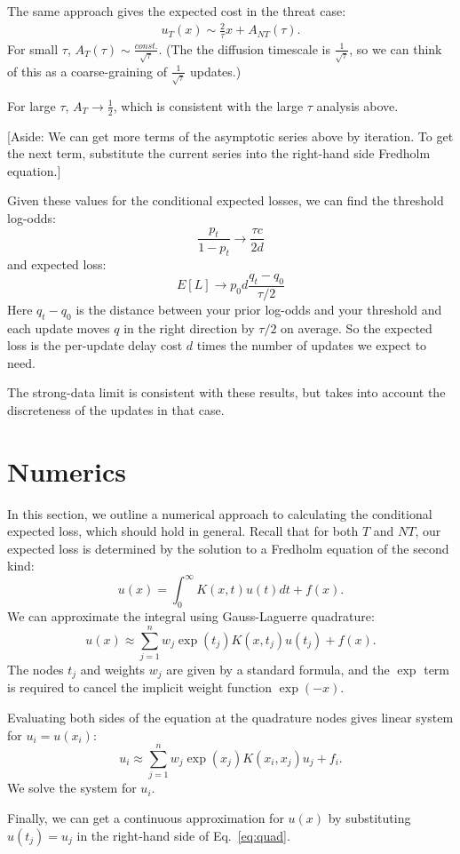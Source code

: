 \documentclass[12pt, letterpaper]{article}
\begin{document}
The same approach gives the expected cost in the threat case:
\begin{align}
    u_{T}(x) \sim \frac{2}{\tau} x + A_{NT}(\tau).
\end{align}
For small $\tau$, $A_{T}(\tau) \sim \frac{const.}{\sqrt{\tau}}$.
(The the diffusion timescale is $\frac{1}{\sqrt{\tau}}$, so we can think of this as a coarse-graining of $\frac{1}{\sqrt{\tau}}$ updates.)

For large $\tau$, $A_{T} \to \frac{1}{2}$, which is consistent with the large $\tau$ analysis above.

[Aside: We can get more terms of the asymptotic series above by iteration. To get the next term, substitute the current series into the right-hand side Fredholm equation.]

Given these values for the conditional expected losses, we can find the threshold log-odds:
\begin{equation}\frac{p_t}{1 - p_t} \to \frac{\tau c}{2 d}\end{equation}
and expected loss:
\begin{equation}E[L] \to p_0 d \frac{q_t - q_0}{\tau / 2}\end{equation}
Here $q_t - q_0$ is the distance between your prior log-odds and your threshold and each update moves $q$ in the right direction by $\tau / 2$ on average.
So the expected loss is the per-update delay cost $d$ times the number of updates we expect to need.

The strong-data limit is consistent with these results, but takes into account the discreteness of the updates in that case.

\section{Numerics}

In this section, we outline a numerical approach to calculating the conditional expected loss, which should hold in general.
Recall that for both $T$ and $NT$, our expected loss is determined by the solution to a Fredholm equation of the second kind:
\begin{equation}
    u(x) = \int_{0}^{\infty} K(x, t) u(t) dt + f(x).
\end{equation}
We can approximate the integral using Gauss-Laguerre quadrature:
\begin{equation}
    u(x) \approx \sum_{j=1}^{n} w_j \exp(t_j) K(x, t_j) u(t_j) + f(x) \label{eq:quad}.
\end{equation}
The nodes $t_j$ and weights $w_j$ are given by a standard formula, and the $\exp$ term is required to cancel the implicit weight function $\exp(-x)$.

Evaluating both sides of the equation at the quadrature nodes gives linear system for $u_i = u(x_i)$:
\begin{equation}
    u_i \approx \sum_{j=1}^{n} w_j \exp(x_j) K(x_i, x_j) u_j + f_i.
\end{equation}
We solve the system for $u_i$.

Finally, we can get a continuous approximation for $u(x)$ by substituting $u(t_j) = u_j$ in the right-hand side of Eq.~\ref{eq:quad}.
\end{document}
